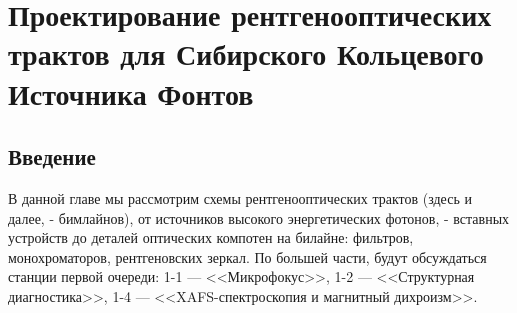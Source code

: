 \chapter{Проектирование рентгенооптических трактов для Сибирского Кольцевого Источника Фонтов}

\section{Введение}
В данной главе мы рассмотрим схемы рентгенооптических трактов (здесь и далее, - бимлайнов), от источников высокого энергетических фотонов, - вставных устройств до деталей оптических компотен на билайне: фильтров, монохроматоров, рентгеновских зеркал. По большей части, будут обсуждаться станции первой очереди: 1-1 --- <<Микрофокус>>, 1-2 --- <<Структурная диагностика>>, 1-4 --- <<XAFS-спектроскопия и магнитный дихроизм>>.  
